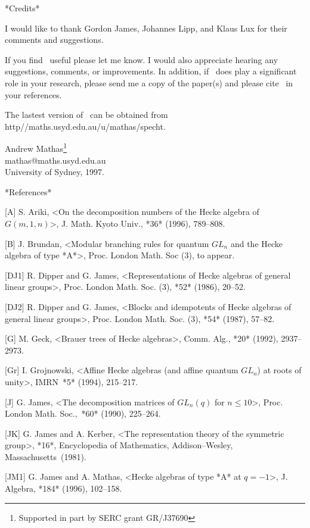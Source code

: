 \medskip

*Credits*

I would like to thank Gordon James, Johannes Lipp, and Klaus Lux
for their comments and suggestions.

If you find \Specht\ useful please let me know. I would also appreciate 
hearing any suggestions, comments, or improvements. In addition, if 
\Specht\ does play a significant role in your research, please send me a 
copy of the paper(s) and please cite \Specht\ in your references.

The lastest version of \Specht\ can be obtained from
http\://maths.usyd.edu.au/u/mathas/specht.

Andrew Mathas\footnote{Supported in part by SERC grant GR/J37690}\\%
           mathas@maths.usyd.edu.au\\ University of Sydney, 1997.

\medskip

*References*

[A] S. Ariki,
  <On the decomposition numbers of the Hecke algebra of $G(m,1,n)$>,
  J. Math. Kyoto Univ., *36* (1996), 789--808.

[B] J. Brundan,
  <Modular branching rules for quantum $GL_n$ and the Hecke algebra 
   of type *A*>, Proc. London Math. Soc (3), to appear. 

[DJ1] R. Dipper and G. James,
  <Representations of {Hecke} algebras of general linear groups>, 
  Proc. London Math. Soc. (3), *52* (1986), 20--52.

[DJ2] R. Dipper and G. James,
  <Blocks and idempotents of {Hecke} algebras of general linear groups>, 
   Proc. London Math. Soc. (3), *54* (1987), 57--82.

[G] M. Geck,
  <Brauer trees of Hecke algebras>, Comm. Alg., *20* (1992), 2937--2973.

[Gr] I. Grojnowski,
  <Affine Hecke algebras (and affine quantum $GL_n$) at roots of unity>, 
   IMRN~*5* (1994), 215--217.

[J] G. James,
  <The decomposition matrices of {$GL_n(q)$} for $n\le10$>,
   Proc. London Math. Soc.,~*60* (1990), 225--264.

[JK] G. James and A. Kerber,
  <The representation theory of the symmetric group>, *16*, 
   Encyclopedia of Mathematics, Addison--Wesley, Massachusetts~(1981).

[JM1] G. James and A. Mathas, 
   <Hecke algebras of type *A* at $q=-1$>{}, J. Algebra,
   *184* (1996), 102--158.

